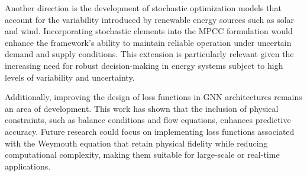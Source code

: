 Another direction is the development of stochastic optimization models that account for the variability introduced by renewable energy sources such as solar and wind. Incorporating stochastic elements into the MPCC formulation would enhance the framework’s ability to maintain reliable operation under uncertain demand and supply conditions. This extension is particularly relevant given the increasing need for robust decision-making in energy systems subject to high levels of variability and uncertainty.


Additionally, improving the design of loss functions in GNN architectures remains an area of development. This work has shown that the inclusion of physical constraints, such as balance conditions and flow equations, enhances predictive accuracy. Future research could focus on implementing loss functions associated with the Weymouth equation that retain physical fidelity while reducing computational complexity, making them suitable for large-scale or real-time applications.

